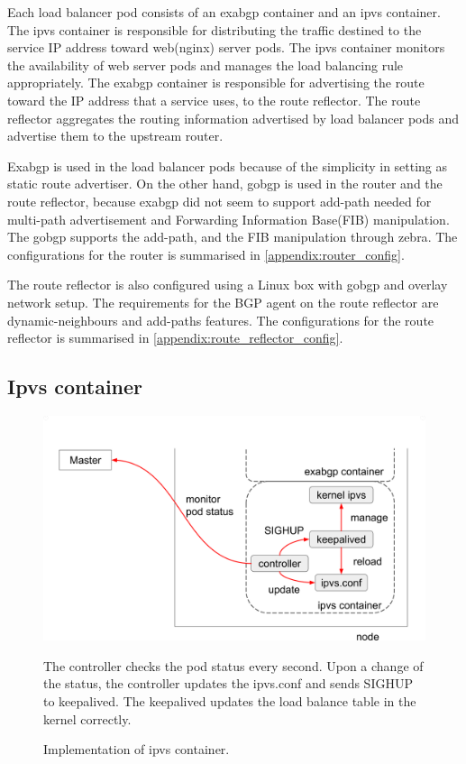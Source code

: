 Each load balancer pod consists of an exabgp container and an ipvs container.
The ipvs container is responsible for distributing the traffic destined to the service IP address toward web(nginx) server pods.
The ipvs container monitors the availability of web server pods and manages the load balancing rule appropriately.
The exabgp container is responsible for advertising the route toward the IP address that a service uses, to the route reflector.
The route reflector aggregates the routing information advertised by load balancer pods and advertise them to the upstream router.

Exabgp is used in the load balancer pods because of the simplicity in setting as static route advertiser.
On the other hand, gobgp is used in the router and the route reflector, because exabgp did not seem to support add-path\cite{rfc7911} needed for multi-path advertisement and Forwarding Information Base(FIB) manipulation\cite{exa-networks_2018}.
The gobgp supports the add-path, and the FIB manipulation through zebra\cite{osrg_gobgp_zebra}.
The configurations for the router is summarised in \ref{appendix:router_config}.

The route reflector is also configured using a Linux box with gobgp and overlay network setup.
The requirements for the BGP agent on the route reflector are dynamic-neighbours and add-paths features.
The configurations for the route reflector is summarised in \ref{appendix:route_reflector_config}.

\subsection{Ipvs container}

\begin{figure}[tb]
\includegraphics[width=\columnwidth]{Figs/ipvs-ingress-schem}
\caption{Implementation of ipvs container.}
The controller checks the pod status every second.
Upon a change of the status, the controller updates the ipvs.conf and sends SIGHUP to keepalived.
The keepalived updates the load balance table in the kernel correctly.
\label{fig:ipvs-ingress-schem}
\end{figure} 

